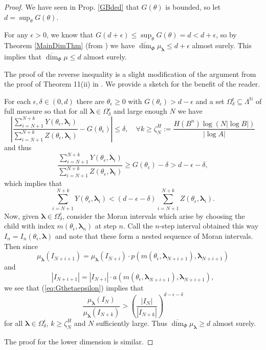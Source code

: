 \documentclass{amsart}
\theoremstyle{plain}
\numberwithin{equation}{section}
\newcommand{\N}{{\mathbb N}}
\newcommand{\blambda}{{\boldsymbol{\lambda}}}
\newcommand{\odim}{\overline{\dim}}
\begin{document}
\begin{proof}
We have seen in Prop. \ref{GBded} that $G(\theta)$ is bounded, so let $d=\sup_{\theta}G(\theta)$.

For any $\epsilon >0$, we know that $G(d+\epsilon)\leq \sup_{\theta}G(\theta)=d<d+\epsilon $, 
so by Theorem \ref{MainDimThm} (from \cite[Thm.11]{HM2}) we have $\odim_{\Phi}\mu_\blambda\leq d+\epsilon$
almost surely. This implies that $\odim_{\Phi}\mu \leq d$ almost surely.

The proof of the reverse inequality is a slight modification of the argument from the proof of Theorem 11(ii) in \cite{HM2}. 
We provide a sketch for the benefit of the reader.

For each $\epsilon ,\delta \in (0,d)$ there are $\theta_{\epsilon} \ge 0$ with $G(\theta_{\epsilon})>d-\epsilon $ and a set $\Omega_{\delta}^{\epsilon} \subseteq \Lambda^\N$
of full measure so that for all $\blambda \in \Omega_{\delta}^{\epsilon}$ and large enough $N$ we have 
\begin{equation*}
    \left| \frac{\sum_{i=N+1}^{N+k}Y(\theta_{\epsilon},\blambda_i)}{\sum_{i=N+1}^{N+k}Z(\theta_{\epsilon},\blambda_i)}-
    G(\theta_{\epsilon})\right| \leq \delta ,\quad \forall k \geq \zeta_N^H :=
   \dfrac{ H(B^n) \log(N |\log B| )}{|\log A|}
\end{equation*}
and thus 
\begin{equation*}
       \frac{\sum_{i=N+1}^{N+k}Y(\theta_{\epsilon},\blambda_i)}{\sum_{i=N+1}^{N+k}Z(\theta_{\epsilon},\blambda_i)}
           \geq G(\theta_{\epsilon})-\delta >d-\epsilon-\delta,
\end{equation*}
which implies that
\begin{equation}    \label{eq:Gthetaepsilon}
  \sum_{i=N+1}^{N+k}Y(\theta_{\epsilon},\blambda_i)<(d-\epsilon -\delta)\sum_{i=N+1}^{N+k}Z(\theta_{\epsilon},\blambda_i).
\end{equation}
Now, given $\blambda \in \Omega_\delta^\epsilon$, consider the Moran intervals which arise by choosing the child with index $m(\theta_\epsilon,\blambda_n)$ at step $n$. 
Call the $n$-step interval obtained this way $I_{n}=I_{n}(\theta_\epsilon,\blambda)$ and note that these form a nested sequence of Moran intervals.
Then since 
\[
    \mu_\blambda(I_{N+i+1}) = \mu_\blambda(I_{N+i}) \cdot p(m(\theta_\epsilon,\blambda_{N+i+1}),\blambda_{N+i+1})
\]
and
\[
   |I_{N+i+1}| = |I_{N+i}| \cdot a(m(\theta_\epsilon,\blambda_{N+i+1}),\blambda_{N+i+1}),
\]
we see that (\ref{eq:Gthetaepsilon}) implies that 
\begin{equation*}
    \frac{\mu_\blambda(I_{N})}{\mu_\blambda(I_{N+k})}>\left( \frac{|I_{N}|}{|I_{N+k}|}\right)^{d-\epsilon -\delta}
\end{equation*}
for all $\blambda \in \Omega_{\delta}^{\epsilon}$, $k\geq \zeta_{N}^{H}$ and $N$ sufficiently large. 
Thus $\odim_{\Phi}\mu_\blambda \geq d$ almost surely.

\smallskip

The proof for the lower dimension is similar.
\end{proof}
\end{document}

